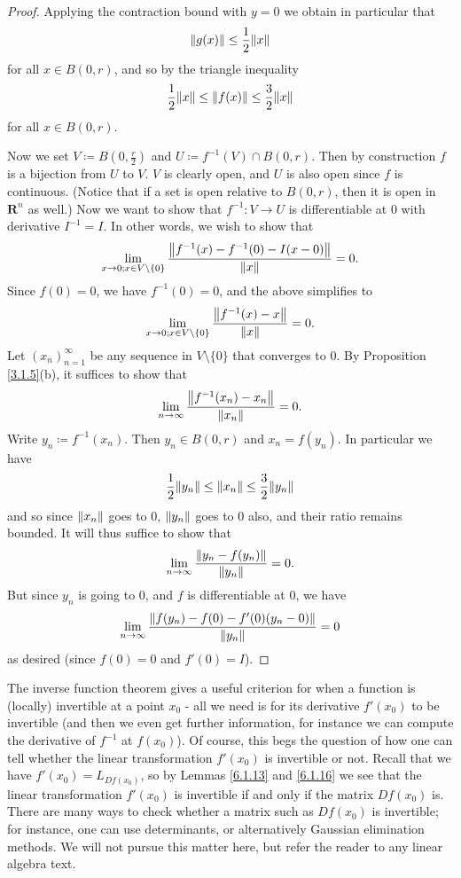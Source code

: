\begin{proof}
    Applying the contraction bound with \(y = 0\) we obtain in particular that
    \[
        \norm*{g(x)} \leq \frac{1}{2} \norm*{x}
    \]
    for all \(x \in B(0, r)\), and so by the triangle inequality
    \[
        \frac{1}{2} \norm*{x} \leq \norm*{f(x)} \leq \frac{3}{2} \norm*{x}
    \]
    for all \(x \in B(0, r)\).

    Now we set \(V \coloneqq B(0, \frac{r}{2})\) and \(U \coloneqq f^{-1}(V) \cap B(0, r)\).
    Then by construction \(f\) is a bijection from \(U\) to \(V\).
    \(V\) is clearly open, and \(U\) is also open since \(f\) is continuous.
    (Notice that if a set is open relative to \(B(0, r)\), then it is open in \(\mathbf{R}^n\) as well.)
    Now we want to show that \(f^{-1} : V \to U\) is differentiable at \(0\) with derivative \(I^{-1} = I\).
    In other words, we wish to show that
    \[
        \lim_{x \to 0 ; x \in V \setminus \{0\}} \frac{\norm*{f^{-1}(x) - f^{-1}(0) - I(x - 0)}}{\norm*{x}} = 0.
    \]
    Since \(f(0) = 0\), we have \(f^{-1}(0) = 0\), and the above simplifies to
    \[
        \lim_{x \to 0 ; x \in V \setminus \{0\}} \frac{\norm*{f^{-1}(x) - x}}{\norm*{x}} = 0.
    \]
    Let \((x_n)_{n = 1}^\infty\) be any sequence in \(V \setminus \{0\}\) that converges to \(0\).
    By Proposition \ref{3.1.5}(b), it suffices to show that
    \[
        \lim_{n \to \infty} \frac{\norm*{f^{-1}(x_n) - x_n}}{\norm*{x_n}} = 0.
    \]
    Write \(y_n \coloneqq f^{-1}(x_n)\).
    Then \(y_n \in B(0, r)\) and \(x_n = f(y_n)\).
    In particular we have
    \[
        \frac{1}{2} \norm*{y_n} \leq \norm*{x_n} \leq \frac{3}{2} \norm*{y_n}
    \]
    and so since \(\norm*{x_n}\) goes to \(0\), \(\norm*{y_n}\) goes to \(0\) also, and their ratio remains bounded.
    It will thus suffice to show that
    \[
        \lim_{n \to \infty} \frac{\norm*{y_n - f(y_n)}}{\norm*{y_n}} = 0.
    \]
    But since \(y_n\) is going to \(0\), and \(f\) is differentiable at \(0\), we have
    \[
        \lim_{n \to \infty} \frac{\norm*{f(y_n) - f(0) - f'(0)(y_n - 0)}}{\norm*{y_n}} = 0
    \]
    as desired (since \(f(0) = 0\) and \(f'(0) = I\)).
\end{proof}

\begin{note}
    The inverse function theorem gives a useful criterion for when a function is (locally) invertible at a point \(x_0\)
    - all we need is for its derivative \(f'(x_0)\) to be invertible
    (and then we even get further information, for instance we can compute the derivative of \(f^{-1}\) at \(f(x_0)\)).
    Of course, this begs the question of how one can tell whether the linear transformation \(f'(x_0)\) is invertible or not.
    Recall that we have \(f'(x_0) = L_{D f(x_0)}\), so by Lemmas \ref{6.1.13} and \ref{6.1.16} we see that the linear transformation \(f'(x_0)\) is invertible if and only if the matrix \(D f(x_0)\) is.
    There are many ways to check whether a matrix such as \(D f(x_0)\) is invertible;
    for instance, one can use determinants, or alternatively Gaussian elimination methods.
    We will not pursue this matter here, but refer the reader to any linear algebra text.
\end{note}

